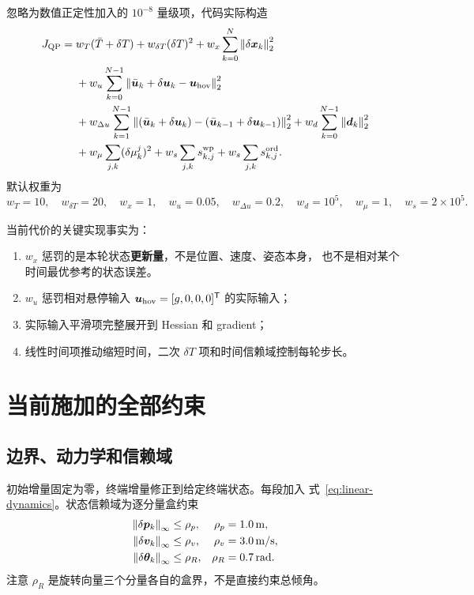 \documentclass[UTF8,a4paper,11pt]{ctexart}
\newcommand{\normtwo}[1]{\left\lVert#1\right\rVert_2}
\newcommand{\norminf}[1]{\left\lVert#1\right\rVert_\infty}
\begin{document}
忽略为数值正定性加入的 $10^{-8}$ 量级项，代码实际构造
\begin{align}
 J_{\rm QP}={}&w_T(\bar T+\delta T)+w_{\delta T}(\delta T)^2
 +w_x\sum_{k=0}^{N}\normtwo{\delta\bm x_k}^2\nonumber\\
 &+w_u\sum_{k=0}^{N-1}\normtwo{
 \bar{\bm u}_k+\delta\bm u_k-\bm u_{\rm hov}}^2\nonumber\\
 &+w_{\Delta u}\sum_{k=1}^{N-1}
 \normtwo{(\bar{\bm u}_k+\delta\bm u_k)-
 (\bar{\bm u}_{k-1}+\delta\bm u_{k-1})}^2
 +w_d\sum_{k=0}^{N-1}\normtwo{\bm d_k}^2\nonumber\\
 &+w_\mu\sum_{j,k}(\delta\mu_k^j)^2
 +w_s\sum_{j,k}s_{k,j}^{\rm wp}
 +w_s\sum_{j,k}s_{k,j}^{\rm ord}.
 \label{eq:actual-cost}
\end{align}
默认权重为
\begin{equation}
 w_T=10,\quad w_{\delta T}=20,\quad w_x=1,\quad w_u=0.05,\quad
 w_{\Delta u}=0.2,\quad w_d=10^5,\quad w_\mu=1,\quad w_s=2\times10^5.
\end{equation}

当前代价的关键实现事实为：
\begin{enumerate}
  \item $w_x$ 惩罚的是本轮状态\textbf{更新量}，不是位置、速度、姿态本身，
  也不是相对某个时间最优参考的状态误差。
  \item $w_u$ 惩罚相对悬停输入
  $\bm u_{\rm hov}=[g,0,0,0]^\mathsf T$ 的实际输入；
  \item 实际输入平滑项完整展开到 Hessian 和 gradient；
  \item 线性时间项推动缩短时间，二次 $\delta T$ 项和时间信赖域控制每轮步长。
\end{enumerate}

\section{当前施加的全部约束}

\subsection{边界、动力学和信赖域}

初始增量固定为零，终端增量修正到给定终端状态。每段加入
式~\eqref{eq:linear-dynamics}。状态信赖域为逐分量盒约束
\begin{align}
 \norminf{\delta\bm p_k}&\leq\rho_p,& \rho_p&=1.0\,{\rm m},\\
 \norminf{\delta\bm v_k}&\leq\rho_v,& \rho_v&=3.0\,{\rm m/s},\\
 \norminf{\delta\bm\theta_k}&\leq\rho_R,& \rho_R&=0.7\,{\rm rad}.
\end{align}
注意 $\rho_R$ 是旋转向量三个分量各自的盒界，不是直接约束总倾角。
\end{document}
